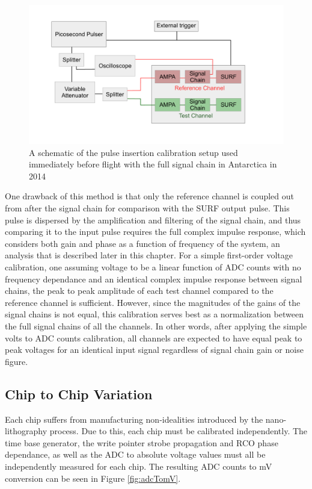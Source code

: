 			
	\begin{figure}
		\includegraphics[width=\textwidth]{figures/antarctica14_calSetup}
		\caption{A schematic of the pulse insertion calibration setup used immediately before flight with the full signal chain in Antarctica in 2014}
		\label{fig:calSetup}
	\end{figure}
		
	One drawback of this method is that only the reference channel is coupled out from after the signal chain for comparison with the SURF output pulse.  This pulse is dispersed by the amplification and filtering of the signal chain, and thus comparing it to the input pulse requires the full complex impulse response, which considers both gain and phase as a function of frequency of the system, an analysis that is described later in this chapter.  For a simple first-order voltage calibration, one assuming voltage to be a linear function of ADC counts with no frequency dependance and an identical complex impulse response between signal chains, the peak to peak amplitude of each test channel compared to the reference channel is sufficient.  However, since the magnitudes of the gains of the signal chains is not equal, this calibration serves best as a normalization between the full signal chains of all the channels.  In other words, after applying the simple volts to ADC counts calibration, all channels are expected to have equal peak to peak voltages for an identical input signal regardless of signal chain gain or noise figure.
		
		
		
	\subsection{Chip to Chip Variation}
		Each chip suffers from manufacturing non-idealities introduced by the nano-lithography process.  Due to this, each chip must be calibrated independently.  The time base generator, the write pointer strobe propagation and RCO phase dependance, as well as the ADC to absolute voltage values must all be independently measured for each chip.  The resulting ADC counts to mV conversion can be seen in Figure \ref{fig:adcTomV}.

